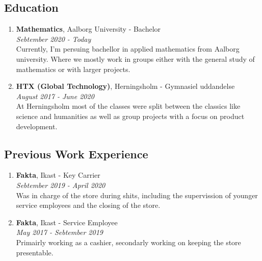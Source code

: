 \documentclass[a4paper, oneside]{book}
\begin{document}
\subsection*{Education}
\begin{enumerate}
      \item \textbf{Mathematics}, Aalborg University - Bachelor\\
        \textit{Sebtember 2020 - Today}\\
        Currently, I'm persuing bachellor in applied mathematics from Aalborg university. Where we mostly work in groups either with the general study of mathematics or with larger projects.

      \item \textbf{HTX (Global Technology)}, Herningsholm - Gymnasiel uddandelse\\
        \textit{August 2017 - June 2020}\\
        At Herningsholm most of the classes were split between the classics like science and humanities as well as group projects with a focus on product development.

\end{enumerate}



\subsection*{Previous Work Experience}
\begin{enumerate}
      \item \textbf{Fakta}, Ikast - Key Carrier\\
        \textit{Sebtember 2019 - April 2020}\\
        Was in charge of the store during shits, including the supervission of younger service employees and the closing of the store.

      \item \textbf{Fakta}, Ikast - Service Employee\\
        \textit{May 2017 - Sebtember 2019}\\
        Primairly working as a cashier, secondarly working on keeping the store presentable.


\end{enumerate}
\end{document}
